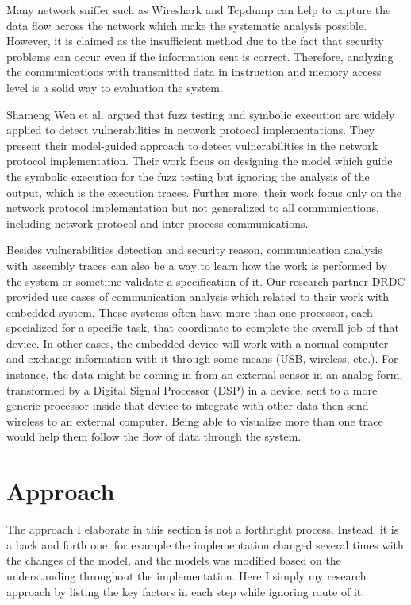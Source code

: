 Many network sniffer such as Wireshark\cite{_wireshark_????} and Tcpdump\cite{tcpdump_tcpdump/libpcap_????} can help to capture the data flow across the network which make the systematic analysis possible. However, it is claimed as the insufficient method due to the fact that security problems can occur even if the information sent is correct. Therefore, analyzing the communications with transmitted data in instruction and memory access level is a solid way to evaluation the system.

Shameng Wen et al. argued that fuzz testing and symbolic execution are widely applied to detect vulnerabilities in network protocol implementations. They present their model-guided approach to detect vulnerabilities in the network protocol implementation. Their work focus on designing the model which guide the symbolic execution for the fuzz testing but ignoring the analysis of the output, which is the execution traces. \cite{wen2017model} Further more, their work focus only on the network protocol implementation but not generalized to all communications, including network protocol and inter process communications.

Besides vulnerabilities detection and security reason, communication analysis with assembly traces can also be a way to learn how the work is performed by the system or sometime validate a specification of it. Our research partner DRDC provided use cases of communication analysis which related to their work with embedded system. These systems often have more than one processor, each specialized for a specific task, that coordinate to complete the overall job of that device.  In other cases, the embedded device will work with a normal computer and exchange information with it through some means
(USB, wireless, etc.).  For instance, the data might be coming in from an external sensor in an analog form, transformed by a Digital Signal Processor (DSP) in a device, sent to a more generic processor inside that device to integrate with other data then send wireless to an external computer. Being able to visualize more than one trace would help them follow the flow of data through the system.

\section{Approach}
The approach I elaborate in this section is not a forthright process. Instead, it is a back and forth one, for example the implementation changed several times with the changes of the model, and the models was modified based on the understanding throughout the implementation. Here I simply my research approach by listing the key factors in each step while ignoring route of it.

